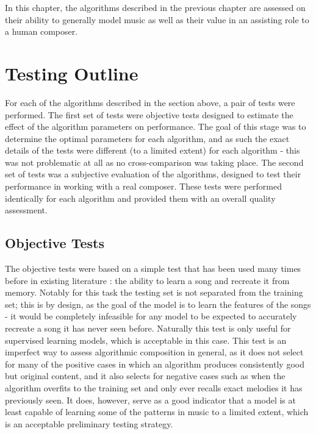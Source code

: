 \documentclass[ author={Stephen Livermore-Tozer},
				supervisor={Dr. Peter Flach},
				degree={MEng},
				title={Algorithmic Co-composition Using Machine Learning},
				subtitle={},
				type={research},
				year={2016} ]{dissertation}
\begin{document}
	In this chapter, the algorithms described in the previous chapter are assessed on their ability to generally model music as well as their value in an assisting role to a human composer. 
	
	\section{Testing Outline}
	
	For each of the algorithms described in the section above, a pair of tests were performed. The first set of tests were objective tests designed to estimate the effect of the algorithm parameters on performance. The goal of this stage was to determine the optimal parameters for each algorithm, and as such the exact details of the tests were different (to a limited extent) for each algorithm - this was not problematic at all as no cross-comparison was taking place. The second set of tests was a subjective evaluation of the algorithms, designed to test their performance in working with a real composer. These tests were performed identically for each algorithm and provided them with an overall quality assessment. 
	
	\subsection{Objective Tests}
	\label{sec:objective-analysis}
	
	The objective tests were based on a simple test that has been used many times before in existing literature \cite{todd1989connectionist,franklin2006recurrent,paiement2007generative}: the ability to learn a song and recreate it from memory. Notably for this task the testing set is not separated from the training set; this is by design, as the goal of the model is to learn the features of the songs - it would be completely infeasible for any model to be expected to accurately recreate a song it has never seen before. Naturally this test is only useful for supervised learning models, which is acceptable in this case. This test is an imperfect way to assess algorithmic composition in general, as it does not select for many of the positive cases in which an algorithm produces consistently good but original content, and it also selects for negative cases such as when the algorithm overfits to the training set and only ever recalls exact melodies it has previously seen. It does, however, serve as a good indicator that a model is at least capable of learning some of the patterns in music to a limited extent, which is an acceptable preliminary testing strategy.
	
\end{document}
